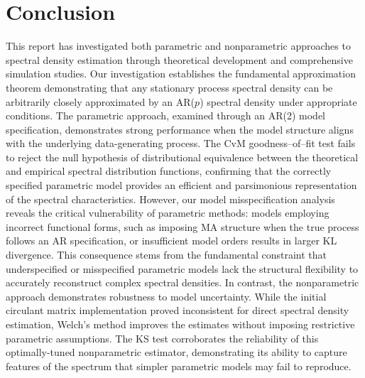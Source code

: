 \documentclass[preprint]{aastex}
\theoremstyle{nonitalicname}
\theoremstyle{plain}
\theoremstyle{remark}
\begin{document}
\section{Conclusion}
This report has investigated both parametric and nonparametric approaches to spectral density estimation through theoretical development and comprehensive simulation studies. Our investigation establishes the fundamental approximation theorem demonstrating that any stationary process spectral density can be arbitrarily closely approximated by an AR($p$) spectral density under appropriate conditions.
The parametric approach, examined through an AR(2) model specification, demonstrates strong performance when the model structure aligns with the underlying data-generating process. The CvM goodness--of--fit test fails to reject the null hypothesis of distributional equivalence between the theoretical and empirical spectral distribution functions, confirming that the correctly specified parametric model provides an efficient and parsimonious representation of the spectral characteristics. However, our model misspecification analysis reveals the critical vulnerability of parametric methods: models employing incorrect functional forms, such as imposing MA structure when the true process follows an AR specification, or insufficient model orders results in larger KL divergence. This consequence stems from the fundamental constraint that underspecified or misspecified parametric models lack the structural flexibility to accurately reconstruct complex spectral densities.
In contrast, the nonparametric approach demonstrates robustness to model uncertainty. While the initial circulant matrix implementation proved inconsistent for direct spectral density estimation, Welch's method improves the estimates without imposing restrictive parametric assumptions. The KS test corroborates the reliability of this optimally-tuned nonparametric estimator, demonstrating its ability to capture features of the spectrum that simpler parametric models may fail to reproduce.
\end{document}
